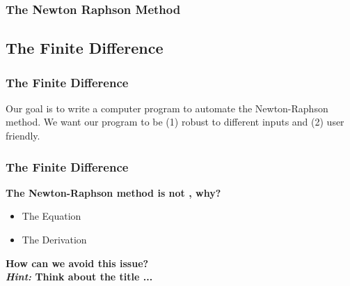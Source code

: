 \documentclass[fleqn]{ltx-talk} %
\newcommand{\sectionIIsubsectionIIItitle}{The Newton Raphson Method}
\newcommand{\sectionIIsubsectionIVtitle}{The Finite Difference}
\begin{document}
			\begin{frame}
				\frametitle{\sectionIIsubsectionIIItitle}
				\bigskip

				\btVFill 
			\end{frame}

		\subsection{\sectionIIsubsectionIVtitle}\label{sectionIIsubsectionIV}

			\begin{frame}
				\frametitle{\sectionIIsubsectionIVtitle}
				\bigskip

				Our goal is to write a computer program to automate the Newton-Raphson method. We want our program to be (1) robust to different inputs and (2) user friendly. 

				\btVFill 
			\end{frame}

			\begin{frame}
				\frametitle{\sectionIIsubsectionIVtitle}
				\bigskip

				\textbf{The Newton-Raphson method is not \BK, why?} \\
				\begin{itemize}
					\item  The Equation\vspace{3mm}	\\
					\item  The Derivation\vspace{3mm}	\\
				\end{itemize}
				\textbf{How can we avoid this issue?} \vspace{10mm}\\

				\textbf{{\itshape Hint:} Think about the title  \BK ...} \vspace{10mm}\\

				\btVFill 
			\end{frame}
\end{document}
